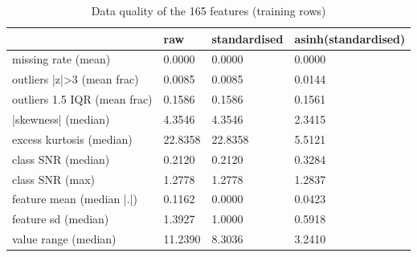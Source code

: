 \begin{table}
\caption{Data quality of the 165 features (training rows)}
\label{tab:01_quality_before_after}
\begin{tabular}{llll}
\toprule
 & raw & standardised & asinh(standardised) \\
\midrule
missing rate (mean) & 0.0000 & 0.0000 & 0.0000 \\
outliers |z|>3 (mean frac) & 0.0085 & 0.0085 & 0.0144 \\
outliers 1.5 IQR (mean frac) & 0.1586 & 0.1586 & 0.1561 \\
|skewness| (median) & 4.3546 & 4.3546 & 2.3415 \\
excess kurtosis (median) & 22.8358 & 22.8358 & 5.5121 \\
class SNR (median) & 0.2120 & 0.2120 & 0.3284 \\
class SNR (max) & 1.2778 & 1.2778 & 1.2837 \\
feature mean (median |.|) & 0.1162 & 0.0000 & 0.0423 \\
feature sd (median) & 1.3927 & 1.0000 & 0.5918 \\
value range (median) & 11.2390 & 8.3036 & 3.2410 \\
\bottomrule
\end{tabular}
\end{table}
